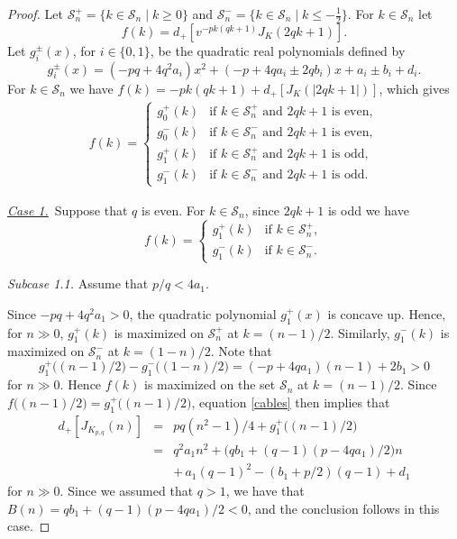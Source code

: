 \documentclass[11pt]{amsart}
\theoremstyle{definition}
\def\CS{\mathcal S}
\begin{document}
\begin{proof}
Let $\CS^+_n=\{k \in \CS_n \mid k \ge 0\}$ and $\CS^-_n=\{k \in \CS_n \mid k \le -\frac{1}{2}\}$.  For $k \in \CS_n$ let $$f(k)=d_+[v^{-pk(qk+1)} J_K(2qk+1)].$$
Let $g_i^{\pm}(x)$, for $i \in \{0,1\}$, be the quadratic real polynomials defined by
$$
g_i^{\pm}(x) = ( -pq + 4q^2 a_i ) x^2 + ( -p + 4q a_i \pm 2q b_i ) x +  a_i \pm b_i + d_i.
$$
For $k \in \CS_n$ we have 
$f(k) = -pk(qk+1)+d_+[J_K(|2qk+1|)]$, which gives
\begin{eqnarray*}
 f(k)=
\begin{cases} 
g_0^+(k) &\mbox{if } k \in \CS^+_n \mbox{ and } 2qk+1 \mbox{ is even}, \\
g_0^-(k) &\mbox{if } k \in \CS^-_n \mbox{ and } 2qk+1 \mbox{ is even},\\
g_1^+(k) &\mbox{if } k \in \CS^+_n \mbox{ and } 2qk+1 \mbox{ is odd}, \\
g_1^-(k) &\mbox{if } k \in \CS^-_n \mbox{ and } 2qk+1 \mbox{ is odd}. 
\end{cases}
\end{eqnarray*}

\smallskip

\underline{\textit{Case 1.}}\   Suppose that $q$ is even.
For $k \in \CS_n$, since $2qk+1$ is odd we have $$f(k)= \begin{cases} g_1^+(k) &\mbox{if } k \in \CS^+_n, \\
g_1^-(k) &\mbox{if } k \in \CS^-_n.  \end{cases}$$
\vskip 0.1in

\textit{Subcase 1.1.} Assume  that  $p/q <4a_1$.

Since $-pq + 4q^2 a_1>0$, the quadratic polynomial $g_1^+(x)$ is concave up. Hence, for $n \gg 0$, $g_1^+(k)$ is maximized on $\CS^+_n$ at $k=(n-1)/2$.  Similarly, $g_1^-(k)$ is maximized on $\CS^-_n$ at $k=(1-n)/2$. Note that $$g_1^+ \big( (n-1)/2 \big)-g_1^-  \big( (1-n)/2 \big)=(-p+4qa_1)(n-1)+2b_1>0$$
for $n \gg 0$. Hence $f(k)$ is maximized on the set $\CS_n$ at $k=(n-1)/2$. Since $f \big( (n-1)/2 \big)=g^+_1 \big( (n-1)/2 \big)$, equation \eqref{cables} then implies that  
\begin{eqnarray*}
d_+[J_{K_{p,q}}(n)] &=& pq(n^2-1)/4+g_1^+ \big((n-1)/2 \big)\\
&=& q^2a_1n^2+ \big(qb_1+(q-1)(p-4qa_1)/2 \big)n\\
&& + \, a_1(q-1)^2-(b_1+p/2)(q-1)+d_1
\end{eqnarray*}
for $n \gg 0$. Since we assumed that $q>1$, we have that $B(n) = qb_1+(q-1)(p-4qa_1)/2<0$, and the conclusion follows in this case.
\vskip 0.1in


\end{proof}
\end{document}
